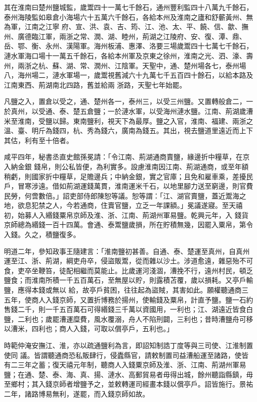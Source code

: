 \begin{pinyinscope}
 其在淮南曰楚州鹽城監，歲鬻四十一萬七千餘石，通州豐利監四十八萬九千餘石，泰州海陵監如皋倉小海場六十五萬六千餘石，各給本州及淮南之廬和舒蘄黃州、無為軍，江南之江寧
 府、宣、洪、袁、吉、筠、江、池、太、平、饒、信、歙、撫州、廣德臨江軍，兩浙之常、潤、湖、睦州，荊湖之江陵府、安、復、潭、鼎、岳、鄂、衡、永州、漢陽軍。海州板浦、惠澤、洛要三場歲鬻四十七萬七千餘石，漣水軍海口場十一萬五千餘石，各給本州軍及京東之徐州，淮南之光、泗、濠、壽州，兩浙之杭、蘇、湖、常、潤州、江陰軍。天聖中，通、楚州場各七，泰州場八，海州場二，漣水軍場一，歲鬻視舊減六十九萬七千五百四十餘石，以給本路及江南東西、荊湖南北四路，舊並給兩
 浙路，天聖七年始罷。



 凡鹽之入，置倉以受之，通、楚州各一，泰州三，以受三州鹽。又置轉般倉二，一於真州，以受通、泰、楚五倉鹽；一於漣水軍，以受海州漣水鹽。江南、荊湖歲漕米至淮南，受鹽以歸。東南鹽利，視天下為最厚。鹽之入官，淮南、福建、兩浙之溫、臺、明斤為錢四，杭、秀為錢六，廣南為錢五。其出，視去鹽道里遠近而上下其估，利有至十倍者。



 咸平四年，秘書丞直史館孫冕請：「令江南、荊湖通商賣鹽，緣邊折中糧草，在京入納金銀
 錢帛，則公私皆便，為利實多。設慮淮南因江南、荊湖通商，或至年額稍虧，則國家折中糧草，足贍邊兵；中納金銀，實之官庫；且免和雇車乘，差擾民戶，冒寒涉遠。借如荊湖運錢萬貫，淮南運米千石，以地里腳力送至窮邊，則官費民勞，何啻數倍。」詔吏部侍郎陳恕等議。恕等謂：「江、湖官賣鹽，蓋近鬻海之地，欲息犯禁之人，今若通商，住賣官鹽，立乏一年課額。」冕議遂寢。至天禧初，始募人入緡錢粟帛京師及淮、浙、江南、荊湖州軍易鹽。乾興元年，入
 錢貨京師總為緡錢一百十四萬。會通、泰鬻鹽歲損，所在貯積無幾，因罷入粟帛，第令入錢。久之，積鹽復多。



 明道二年，參知政事王隨建言：「淮南鹽初甚善。自通、泰、楚運至真州，自真州運至江、浙、荊湖，綱吏舟卒，侵盜販鬻，從而雜以沙土。涉道愈遠，雜惡殆不可食，吏卒坐鞭笞，徒配相繼而莫能止。比歲運河淺涸，漕挽不行，遠州村民，頓乏鹽食；而淮南所積一千五百萬石，至無屋以貯，則露積苫覆，歲以損耗。又亭戶輸鹽，應得本錢或無以
 給，故亭戶貧困，往往起為盜賊，其害如此。願權聽通商三五年，使商人入錢京師，又置折博務於揚州，使輸錢及粟帛，計直予鹽。鹽一石約售錢二千，則一千五百萬石可得緡錢三千萬以資國用，一利也；江、湖遠近皆食白鹽，二利也；歲罷漕運糜費，風水覆溺，舟人不陷刑闢，三利也；昔時漕鹽舟可移以漕米，四利也；商人入錢，可取以償亭戶，五利也。」



 時範仲淹安撫江、淮，亦以疏通鹽利為言，即詔知制誥丁度等與三司使、江淮制置使同
 議。皆謂聽通商恐私販肆行，侵蠹縣官，請敕制置司益漕船運至諸路，使皆有二三年之蓄；復天禧元年制，聽商人入錢粟京師及淮、浙、江南、荊湖州軍易鹽；在通、楚、泰、海、真、揚、漣水、高郵貿易者毋得出城，餘州聽詣縣鎮，毋至鄉村；其入錢京師者增鹽予之，並敕轉運司經畫本錢以償亭戶。詔皆施行。景祐二年，諸路博易無利，遂罷，而入錢京師如故。




\end{pinyinscope}
